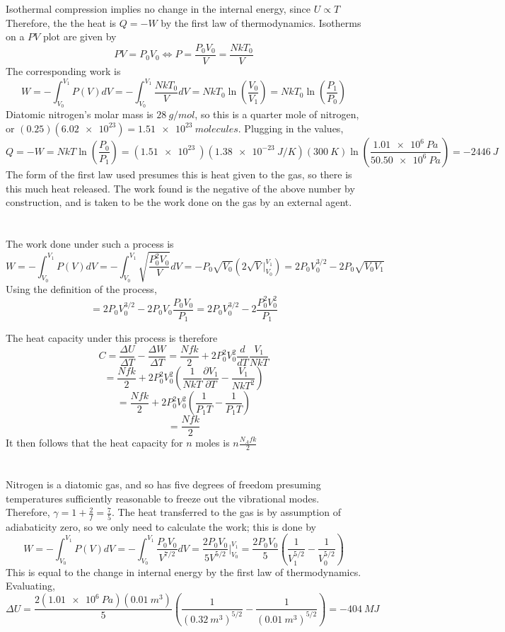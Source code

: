 \documentclass{article}
\begin{document}
\section{}
Isothermal compression implies no change in the internal energy, since $U\propto T$ Therefore, the the heat is $Q=-W$ by the first law of thermodynamics. Isotherms on a $PV$ plot are given by \[PV=P_0V_0\Leftrightarrow P=\frac{P_0V_0}{V}=\frac{NkT_0}{V}\]
The corresponding work is
\[W=-\int_{V_0}^{V_1}P(V)dV=-\int_{V_0}^{V_1}\frac{NkT_0}{V}dV=NkT_0\ln\left( \frac{V_0}{V_1} \right)=NkT_0\ln\left( \frac{P_1}{P_0} \right)\]
Diatomic nitrogen's molar mass is $\SI{28}{g/mol}$, so this is a quarter mole of nitrogen, or $(0.25)(\SI{6.02e23})=\SI{1.51e23}{molecules}$.
Plugging in the values,
\[Q=-W=NkT\ln\left( \frac{P_0}{P_1} \right)=(\SI{1.51e23}{})(\SI{1.38e-23}{J/K})(\SI{300}{K})\ln\left( \frac{\SI{1.01e6}{Pa}}{\SI{50.50e6}{Pa}} \right)=-\SI{2446}{J}\]
The form of the first law used presumes this is heat given to the gas, so there is this much heat released. The work found is the negative of the above number by construction, and is taken to be the work done on the gas by an external agent.

\section{}
The work done under such a process is
\[W=-\int_{V_0}^{V_1}P(V)dV=-\int_{V_0}^{V_1}\sqrt{\frac{P_0^2V_0}{V}}dV=-P_0\sqrt{V_0}\left( 2\sqrt{V}\bigg|_{V_0}^{V_1} \right)=2P_0V_0^{3/2}-2P_0\sqrt{V_0V_1}\]
Using the definition of the process,
\[=2P_0V_0^{3/2}-2P_0V_0\frac{P_0V_0}{P_1}=2P_0V_0^{3/2}-2\frac{P_0^2V_0^2}{P_1}\]

The heat capacity under this process is therefore
\[C=\frac{\Delta U}{\Delta T} - \frac{\Delta W}{\Delta T}=\frac{Nfk}{2}+2P_0^2V_0^2\frac{d}{d T}\frac{V_1}{NkT}\]
\[=\frac{Nfk}{2}+2P_0^2V_0^2\left( \frac{1}{NkT}\frac{\partial V_1}{\partial T}-\frac{V_1}{NkT^2} \right)\]
\[=\frac{Nfk}{2}+2P_0^2V_0^2\left( \frac{1}{P_1T}- \frac{1}{P_1T}\right)\]
\[=\frac{Nfk}{2}\]
It then follows that the heat capacity for $n$ moles is $n\frac{N_Afk}{2}$

\section{}
Nitrogen is a diatomic gas, and so has five degrees of freedom presuming temperatures sufficiently reasonable to freeze out the vibrational modes. Therefore, $\gamma=1+\frac{2}{f}=\frac{7}{5}$. The heat transferred to the gas is by assumption of adiabaticity zero, so we only need to calculate the work; this is done by
\[W=-\int_{V_0}^{V_1}P(V)dV=-\int_{V_0}^{V_1}\frac{P_0V_0}{V^{7/2}}dV=\frac{2P_0V_0}{5V^{5/2}}\bigg|_{V_0}^{V_1}=\frac{2P_0V_0}{5}\left( \frac{1}{V_1^{5/2}}-\frac{1}{V_0^{5/2}} \right)\]
This is equal to the change in internal energy by the first law of thermodynamics. Evaluating,
\[\Delta U=\frac{2(\SI{1.01e6}{Pa})(\SI{0.01}{m^3})}{5}\left( \frac{1}{(\SI{0.32}{m^3})^{5/2}}-\frac{1}{(\SI{0.01}{m^3})^{5/2}} \right)=\SI{-404}{MJ}\]
\end{document}
